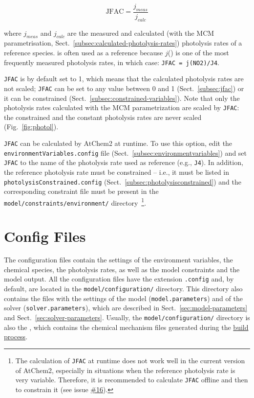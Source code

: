 \begin{equation}
  \mathrm{JFAC} = \frac{j_{meas}}{j_{calc}}
\end{equation}

where $j_{meas}$ and $j_{calc}$ are the measured and calculated (with
the MCM parametrisation, Sect.~\ref{subsec:calculated-photolysis-rates})
photolysis rates of a reference species.  is often used as a
reference because $j$() is one of the most frequently measured
photolysis rates, in which case: \verb|JFAC = j(NO2)/J4|.

\texttt{JFAC} is by default set to 1, which means that the calculated
photolysis rates are not scaled; \texttt{JFAC} can be set to any value
between 0 and 1 (Sect.~\ref{subsec:jfac}) or it can be constrained
(Sect.~\ref{subsec:constrained-variables}). Note that only the
photolysis rates calculated with the MCM parametrization are scaled by
\texttt{JFAC}: the constrained and the constant photolysis rates are
never scaled (Fig.~\ref{fig:photol}).

\texttt{JFAC} can be calculated by AtChem2 at runtime. To use this
option, edit the \texttt{environmentVariables.config} file
(Sect.~\ref{subsec:environmentvariables}) and set \texttt{JFAC} to the
name of the photolysis rate used as reference (e.g., \texttt{J4}). In
addition, the reference photolysis rate must be constrained -- i.e.,
it must be listed in \texttt{photolysisConstrained.config}
(Sect.~\ref{subsec:photolysisconstrained}) and the corresponding
constraint file must be present in the
\texttt{model/constraints/environment/} directory~\footnote{The
  calculation of \texttt{JFAC} at runtime does not work well in the
  current version of AtChem2, especially in situations when the
  reference photolysis rate is very variable. Therefore, it is
  recommended to calculate \texttt{JFAC} offline and then to constrain it
  (see issue \href{https://github.com/AtChem/AtChem2/issues/16}{\#16}).}.

\section{Config Files} \label{sec:config-files}

The configuration files contain the settings of the environment
variables, the chemical species, the photolysis rates, as well as the
model constraints and the model output. All the configuration files
have the extension \texttt{.config} and, by default, are located in
the \texttt{model/configuration/} directory. This directory also
contains the files with the settings of the model
(\texttt{model.parameters}) and of the solver
(\texttt{solver.parameters}), which are described in
Sect.~\ref{sec:model-parameters} and Sect.~\ref{sec:solver-parameters}.
Usually, the \texttt{model/configuration/} directory is also the
\sharedir, which contains the chemical mechanism files generated
during the \hyperref[subsec:build-process]{build process}.

